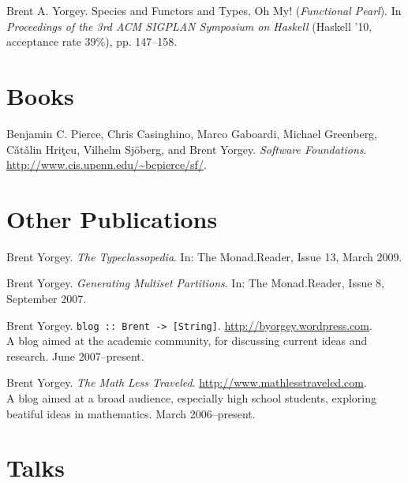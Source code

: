 \documentclass[12pt]{article}
\newcommand{\cvitem}{\par\hangpara{2em}{1}}
\begin{document}
\cvitem Brent A. Yorgey. Species and Functors and Types, Oh
  My! (\emph{Functional Pearl}). In \emph{Proceedings of the 3rd ACM SIGPLAN
  Symposium on Haskell} (Haskell '10, acceptance rate 39\%), pp. 147--158.



\section*{Books}
\cvitem Benjamin C. Pierce, Chris Casinghino, Marco Gaboardi, Michael Greenberg,
C{\v a}t{\v a}lin Hri{\c t}cu, Vilhelm Sj\"oberg, and Brent Yorgey. \emph{Software
  Foundations}. \url{http://www.cis.upenn.edu/~bcpierce/sf/}.

\section*{Other Publications}
\cvitem Brent Yorgey. \emph{The Typeclassopedia}. In: The
Monad.Reader, Issue 13, March 2009.

\cvitem Brent Yorgey. \emph{Generating Multiset Partitions}.  In: The
Monad.Reader, Issue 8, September 2007.

\cvitem Brent Yorgey. \texttt{blog :: Brent ->
  [String]}. \url{http://byorgey.wordpress.com}.  \\
A blog aimed at the academic community, for discussing current ideas
and research.  June 2007--present.

\cvitem Brent Yorgey. \emph{The Math Less
  Traveled}. \url{http://www.mathlesstraveled.com}. \\
A blog aimed at a broad audience, especially high school students,
exploring beatiful ideas in mathematics.  March 2006--present.

\section*{Talks}
\end{document}
